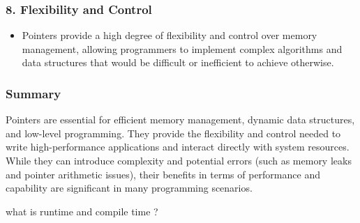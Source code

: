 \begin{botresponse}
\subsubsection{8. \textbf{Flexibility and Control}}

\begin{itemize}
\item Pointers provide a high degree of flexibility and control over memory management, allowing programmers to implement complex algorithms and data structures that would be difficult or inefficient to achieve otherwise.
\end{itemize}

\subsubsection{Summary}

Pointers are essential for efficient memory management, dynamic data structures, and low-level programming. They provide the flexibility and control needed to write high-performance applications and interact directly with system resources. While they can introduce complexity and potential errors (such as memory leaks and pointer arithmetic issues), their benefits in terms of performance and capability are significant in many programming scenarios.

\end{botresponse}

\begin{userprompt}

what is runtime and compile time ?

\end{userprompt}

